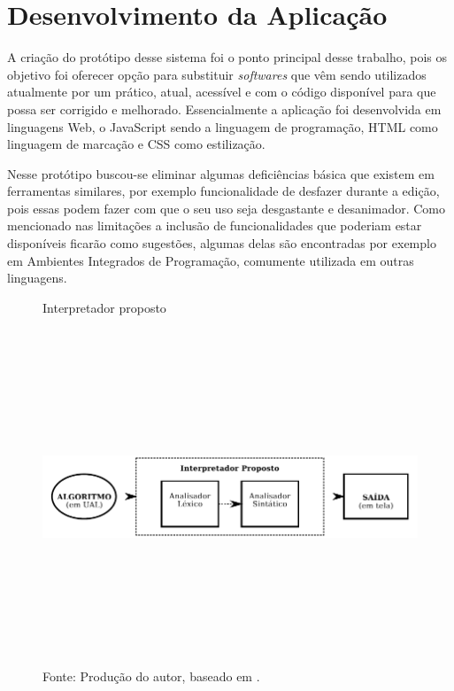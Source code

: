 
\ifdraft{\color{green}}{}\chapter{Desenvolvimento da Aplicação}

A criação do protótipo desse sistema foi o ponto principal desse trabalho, pois os objetivo foi oferecer opção para substituir \textit{softwares} que vêm sendo utilizados atualmente por um prático, atual, acessível e com o código disponível para que possa ser corrigido e melhorado. Essencialmente a aplicação foi desenvolvida em linguagens Web, o JavaScript sendo a linguagem de programação, HTML como linguagem de marcação e CSS como estilização.

Nesse protótipo buscou-se eliminar algumas deficiências básica que existem em ferramentas similares, por exemplo funcionalidade de desfazer durante a edição, pois essas podem fazer com que o seu uso seja desgastante e desanimador. Como mencionado nas limitações a inclusão de funcionalidades que poderiam estar disponíveis ficarão como sugestões, algumas delas são encontradas por exemplo em Ambientes Integrados de Programação, comumente utilizada em outras linguagens.

\begin{figure}[h]
  \ifdraft{\color{green}}{}\caption{\ifdraft{\color{green}}{}Interpretador proposto}\label{fig:analisador}
  \centering
\includegraphics[width=\textwidth,height=10cm,keepaspectratio]{figures/interpretador-proposto.pdf}
  \caption*{\ifdraft{\color{green}}{}\footnotesize Fonte: Produção do autor, baseado em .}
\end{figure}

